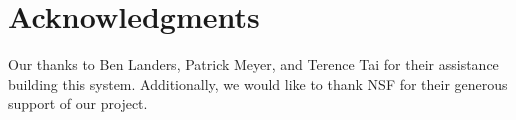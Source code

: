 \documentclass{sig-alternate}
\begin{document}

















\section{Acknowledgments}

Our thanks to Ben Landers, Patrick Meyer, and Terence Tai for their assistance building this system. Additionally, we would like to thank NSF for their generous support of our project.


  
\end{document}
